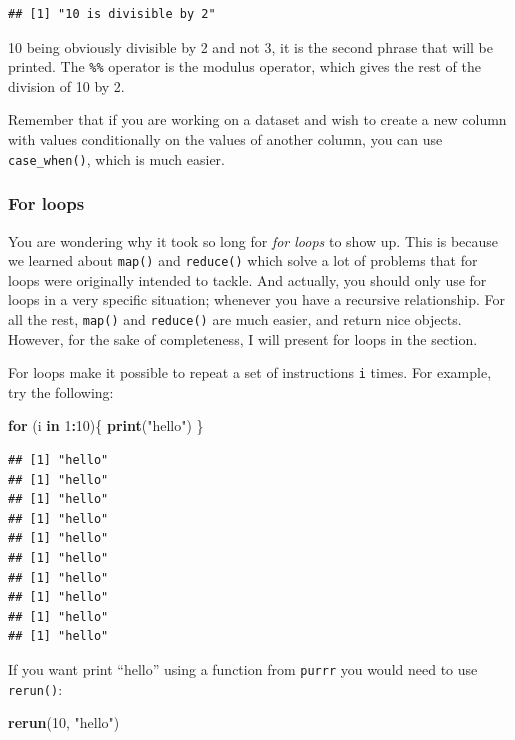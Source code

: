 \documentclass[]{gitbook}
\newenvironment{Shaded}{\begin{snugshade}}{\end{snugshade}}
\newcommand{\ControlFlowTok}[1]{\textcolor[rgb]{0.13,0.29,0.53}{\textbf{#1}}}
\newcommand{\DecValTok}[1]{\textcolor[rgb]{0.00,0.00,0.81}{#1}}
\newcommand{\KeywordTok}[1]{\textcolor[rgb]{0.13,0.29,0.53}{\textbf{#1}}}
\newcommand{\NormalTok}[1]{#1}
\newcommand{\OperatorTok}[1]{\textcolor[rgb]{0.81,0.36,0.00}{\textbf{#1}}}
\newcommand{\StringTok}[1]{\textcolor[rgb]{0.31,0.60,0.02}{#1}}
\theoremstyle{definition}
\theoremstyle{definition}
\theoremstyle{definition}
\theoremstyle{remark}
\begin{document}
\begin{verbatim}
## [1] "10 is divisible by 2"
\end{verbatim}

10 being obviously divisible by 2 and not 3, it is the second phrase
that will be printed. The \texttt{\%\%} operator is the modulus
operator, which gives the rest of the division of 10 by 2.

Remember that if you are working on a dataset and wish to create a new
column with values conditionally on the values of another column, you
can use \texttt{case\_when()}, which is much easier.

\hypertarget{for-loops}{%
\subsubsection{For loops}\label{for-loops}}

You are wondering why it took so long for \emph{for loops} to show up.
This is because we learned about \texttt{map()} and \texttt{reduce()}
which solve a lot of problems that for loops were originally intended to
tackle. And actually, you should only use for loops in a very specific
situation; whenever you have a recursive relationship. For all the rest,
\texttt{map()} and \texttt{reduce()} are much easier, and return nice
objects. However, for the sake of completeness, I will present for loops
in the section.

For loops make it possible to repeat a set of instructions \texttt{i}
times. For example, try the following:

\begin{Shaded}
\begin{Highlighting}[]
\ControlFlowTok{for}\NormalTok{ (i }\ControlFlowTok{in} \DecValTok{1}\OperatorTok{:}\DecValTok{10}\NormalTok{)\{}
  \KeywordTok{print}\NormalTok{(}\StringTok{"hello"}\NormalTok{)}
\NormalTok{\}}
\end{Highlighting}
\end{Shaded}

\begin{verbatim}
## [1] "hello"
## [1] "hello"
## [1] "hello"
## [1] "hello"
## [1] "hello"
## [1] "hello"
## [1] "hello"
## [1] "hello"
## [1] "hello"
## [1] "hello"
\end{verbatim}

If you want print ``hello'' using a function from \texttt{purrr} you
would need to use \texttt{rerun()}:

\begin{Shaded}
\begin{Highlighting}[]
\KeywordTok{rerun}\NormalTok{(}\DecValTok{10}\NormalTok{, }\StringTok{"hello"}\NormalTok{)}
\end{Highlighting}
\end{Shaded}
\end{document}
